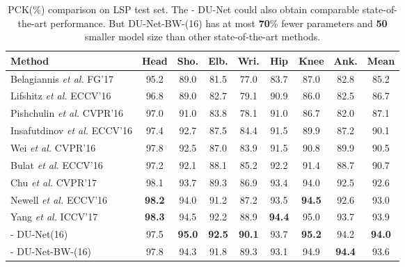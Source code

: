 \documentclass[runningheads]{llncs}
\begin{document}
\begin{table}[htb]
\begin{center}
\small
\caption{PCK(\%) comparison on LSP test set. The - DU-Net could also obtain comparable state-of-the-art performance. But DU-Net-BW-(16) has at most {\bf 70}\% fewer parameters and {\bf 50} smaller model size than other state-of-the-art methods.}\label{tb:lsp}
\setlength\tabcolsep{1.5pt}
\begin{tabular}{@{}lcccccccc@{}}
\toprule
Method & Head & Sho. & Elb. & Wri. & Hip & Knee & Ank. & Mean\\
\hline
Belagiannis \textit{et al.} FG'17 \cite{belagiannis2017recurrent} & 95.2 & 89.0 & 81.5 & 77.0 & 83.7 & 87.0 & 82.8 & 85.2\\
Lifshitz \textit{et al.} ECCV'16 \cite{lifshitz2016human} & 96.8 & 89.0 & 82.7 & 79.1 & 90.9 & 86.0 & 82.5 & 86.7\\
Pishchulin \textit{et al.} CVPR'16 \cite{pishchulin2016deepcut} &  97.0 & 91.0 & 83.8 & 78.1 & 91.0 & 86.7 & 82.0 & 87.1\\
Insafutdinov \textit{et al.} ECCV'16 \cite{insafutdinov2016deepercut}& 97.4 & 92.7 & 87.5 & 84.4 & 91.5 & 89.9 & 87.2 & 90.1\\
Wei \textit{et al.} CVPR'16 \cite{wei2016convolutional}& 97.8 & 92.5 & 87.0 & 83.9 & 91.5 & 90.8 & 89.9 & 90.5\\
Bulat \textit{et al.} ECCV'16 \cite{bulat2016human}& 97.2 & 92.1 & 88.1 & 85.2 & 92.2 & 91.4 & 88.7 & 90.7\\
Chu \textit{et al.} CVPR'17 \cite{chu2017multi}& 98.1 & 93.7 & 89.3 & 86.9 &  93.4 & 94.0 & 92.5 & 92.6\\
Newell {\it et al.} ECCV'16 \cite{newell2016stacked} & {\bf 98.2} & 94.0 & 91.2 & 87.2 & 93.5 & {\bf 94.5} & 92.6 & 93.0\\
Yang \textit{et al.} ICCV'17 \cite{yang2017learning} & {\bf 98.3} & 94.5 & 92.2 & 88.9 & {\bf 94.4} & 95.0 & 93.7 & 93.9\\
\hline
- DU-Net(16) &  97.5 & {\bf 95.0} & {\bf 92.5} & {\bf 90.1} &  93.7 &  {\bf 95.2} & 94.2 & {\bf 94.0}\\
- DU-Net-BW-(16) &  97.8 & 94.3 & 91.8 & 89.3 &  93.1 &  94.9 & {\bf 94.4} & 93.6\\

\bottomrule
\end{tabular}
\end{center}
\end{table}
\end{document}
